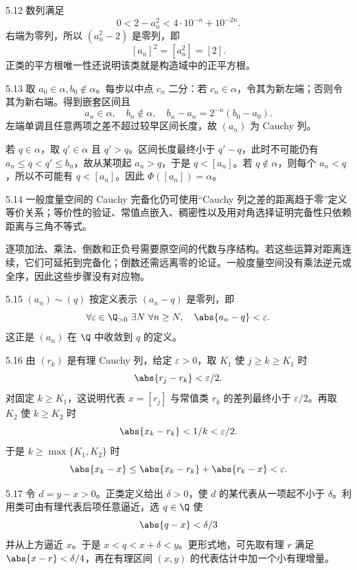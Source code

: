 \begin{solution}{5.12}
数列满足
\[
 0<2-a_n^2<4\cdot10^{-n}+10^{-2n}.
\]
右端为零列，所以 \((a_n^2-2)\) 是零列，即
\[
 [a_n]^2=[a_n^2]=[2].
\]
正类的平方根唯一性还说明该类就是构造域中的正平方根。
\end{solution}

\begin{solution}{5.13}
取 \(a_0\in\alpha,b_0\notin\alpha\)。每步以中点 \(c_n\) 二分：若 \(c_n\in\alpha\)，令其为新左端；否则令其为新右端。得到嵌套区间且
\[
 a_n\in\alpha,\quad b_n\notin\alpha,\quad
 b_n-a_n=2^{-n}(b_0-a_0).
\]
左端单调且任意两项之差不超过较早区间长度，故 \((a_n)\) 为 Cauchy 列。

若 \(q\in\alpha\)，取 \(q'\in\alpha\) 且 \(q'>q\)。区间长度最终小于 \(q'-q\)，此时不可能仍有 \(a_n\le q<q'\le b_n\)，故从某项起 \(a_n>q\)，于是 \(q<[a_n]\)。若 \(q\notin\alpha\)，则每个 \(a_n<q\)，所以不可能有 \(q<[a_n]\)。因此 \(\Phi([a_n])=\alpha\)。
\end{solution}

\begin{solution}{5.14}
一般度量空间的 Cauchy 完备化仍可使用“Cauchy 列之差的距离趋于零”定义等价关系；等价性的验证、常值点嵌入、稠密性以及用对角选择证明完备性只依赖距离与三角不等式。

逐项加法、乘法、倒数和正负号需要原空间的代数与序结构。若这些运算对距离连续，它们可延拓到完备化；倒数还需远离零的论证。一般度量空间没有乘法逆元或全序，因此这些步骤没有对应物。
\end{solution}

\begin{solution}{5.15}
\((a_n)\sim(q)\) 按定义表示 \((a_n-q)\) 是零列，即
\[
 \forall\varepsilon\in\Q_{>0}\ \exists N\
 \forall n\ge N,\quad\abs{a_n-q}<\varepsilon.
\]
这正是 \((a_n)\) 在 \(\Q\) 中收敛到 \(q\) 的定义。
\end{solution}

\begin{solution}{5.16}
由 \((r_k)\) 是有理 Cauchy 列，给定 \(\varepsilon>0\)，取 \(K_1\) 使 \(j\ge k\ge K_1\) 时
\[
 \abs{r_j-r_k}<\varepsilon/2.
\]
对固定 \(k\ge K_1\)，这说明代表 \(x=[r_j]\) 与常值类 \(r_k\) 的差列最终小于 \(\varepsilon/2\)。再取 \(K_2\) 使 \(k\ge K_2\) 时
\[
 \abs{x_k-r_k}<1/k<\varepsilon/2.
\]
于是 \(k\ge\max\{K_1,K_2\}\) 时
\[
 \abs{x_k-x}\le\abs{x_k-r_k}+\abs{r_k-x}<\varepsilon.
\]
\end{solution}

\begin{solution}{5.17}
令 \(d=y-x>0\)。正类定义给出 \(\delta>0\)，使 \(d\) 的某代表从一项起不小于 \(\delta\)。利用类可由有理代表后项任意逼近，选 \(q\in\Q\) 使
\[
 \abs{q-x}<\delta/3
\]
并从上方逼近 \(x\)。于是 \(x<q<x+\delta<y\)。更形式地，可先取有理 \(r\) 满足 \(\abs{x-r}<\delta/4\)，再在有理区间 \((x,y)\) 的代表估计中加一个小有理增量。
\end{solution}

